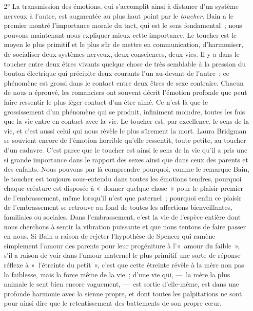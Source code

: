 \documentclass[french,twoside]{book} %
\begin{document}
2° La transmission des émotions, qui s’accomplit ainsi à distance d’un système nerveux à l’autre, est augmentée au plus haut point par le \emph{toucher}. Bain a le premier montré l’importance morale du tact, qui est le sens fondamental ; nous pouvons maintenant nous expliquer mieux cette importance. Le toucher est le moyen le plus primitif et le plus sûr de mettre en communication, d’harmoniser, de socialiser deux systèmes nerveux, deux consciences, deux vies. Il y a dans le toucher entre deux êtres vivants quelque chose de très semblable à la pression du bouton électrique qui précipite deux courants l’un au-devant de l’autre ; ce phénomène est grossi dans le contact entre deux êtres de sexe contraire. Chacun de nous a éprouvé, les romanciers ont souvent décrit l’émotion profonde que peut faire ressentir le plus léger contact d’un être aimé. Ce n’est là que le grossissement d’un phénomène qui se produit, infiniment moindre, toutes les fois que la vie entre en contact avec la vie. Le toucher est, par excellence, le sens de la vie, et c’est aussi celui qui nous révèle le plus sûrement la mort. Laura Bridgman se souvient encore de l’émotion horrible qu’elle ressentit, toute petite, au toucher d’un cadavre. C’est parce que le toucher est ainsi le sens de la vie qu’il a pris une si grande importance dans le rapport des sexes ainsi que dans ceux des parents et des enfants. Nous pouvons par là comprendre pourquoi, comme le remarque Bain, le toucher est toujours sous-entendu dans toutes les émotions tendres, pourquoi chaque créature est disposée à « donner quelque chose » pour le plaisir premier de l’embrassement, même lorsqu’il n’est que paternel ; pourquoi enfin ce plaisir de l’embrassement se retrouve au fond de toutes les affections bienveillantes, familiales ou sociales. Dans l’embrassement, c’est la vie de l’espèce entière dont nous cherchons à sentir la vibration puissante et que nous tentons de faire passer en nous. Si Bain a raison de rejeter l’hypothèse de Spencer qui ramène simplement l’amour des parents pour leur progéniture à l’« amour du faible », s’il a raison de voir dans l’amour maternel le plus primitif une sorte de réponse réflexe à « l’étreinte du petit », c’est que cette étreinte révèle à la mère non pas la faiblesse, mais la force même de la vie ; d’une vie qui, — la mère la plus animale le sent bien encore vaguement, — est sortie d’elle-même, est dans une profonde harmonie avec la sienne propre, et dont toutes les palpitations ne sont pour ainsi dire que le retentissement des battements de son propre cœur.\par
\end{document}

